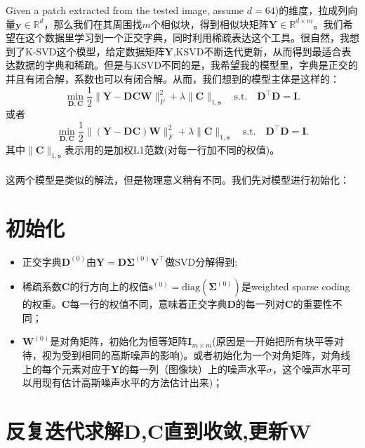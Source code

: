 \documentclass[10pt,twocolumn,letterpaper]{article}
\begin{document}
Given a patch extracted from the tested image, assume $d=64$)的维度，拉成列向量$\mathbf{y}\in\mathbb{R}^{d}$，那么我们在其周围找$m$个相似块，得到相似块矩阵$\mathbf{Y}\in\mathbb{R}^{d\times m}$。我们希望在这个数据里学习到一个正交字典，同时利用稀疏表达这个工具。很自然，我想到了K-SVD这个模型，给定数据矩阵$\mathbf{Y}$,KSVD不断迭代更新，从而得到最适合表达数据的字典和稀疏。但是与KSVD不同的是，我希望我的模型里，字典是正交的并且有闭合解，系数也可以有闭合解。从而，我们想到的模型主体是这样的：
\begin{equation}
\min_{\mathbf{D},\mathbf{C}}\frac{1}{2}\|\mathbf{Y}-\mathbf{D}\mathbf{C}\mathbf{W}\|_{F}^{2}
+
\lambda\|\mathbf{C}\|_{1,\mathbf{s}}
\quad
\text{s.t.}
\quad
\mathbf{D}^{\top}\mathbf{D} =\mathbf{I}. 
\end{equation}
或者
\begin{equation}
\min_{\mathbf{D},\mathbf{C}}\frac{1}{2}\|(\mathbf{Y}-\mathbf{D}\mathbf{C})\mathbf{W}\|_{F}^{2}
+
\lambda\|\mathbf{C}\|_{1,\mathbf{s}}
\quad
\text{s.t.}
\quad
\mathbf{D}^{\top}\mathbf{D} =\mathbf{I}. 
\end{equation}
其中$\|\mathbf{C}\|_{1,\mathbf{s}}$表示用的是加权L1范数(对每一行加不同的权值)。
\\
\\
这两个模型是类似的解法，但是物理意义稍有不同。我们先对模型进行初始化：


\section{初始化}
\begin{itemize}
\item 正交字典$\mathbf{D}^{(0)}$由$\mathbf{Y}=\mathbf{D}\mathbf{\Sigma}^{(0)}\mathbf{V}^{\top}$做SVD分解得到;
\item 稀疏系数$\mathbf{C}$的行方向上的权值$\mathbf{s}^{(0)}=\text{diag}(\mathbf{\Sigma}^{(0)})$是weighted sparse coding的权重。$\mathbf{C}$每一行的权值不同，意味着正交字典$\mathbf{D}$的每一列对$\mathbf{C}$的重要性不同；
\item $\mathbf{W}^{(0)}$是对角矩阵，初始化为恒等矩阵$\mathbf{I}_{m\times m}$(原因是一开始把所有块平等对待，视为受到相同的高斯噪声的影响)。或者初始化为一个对角矩阵，对角线上的每个元素对应于$\mathbf{Y}$的每一列（图像块）上的噪声水平$\sigma$，这个噪声水平可以用现有估计高斯噪声水平的方法估计出来)；
\end{itemize}


\section{反复迭代求解$\mathbf{D}$,$\mathbf{C}$直到收敛,更新$\mathbf{W}$ }
\end{document}

